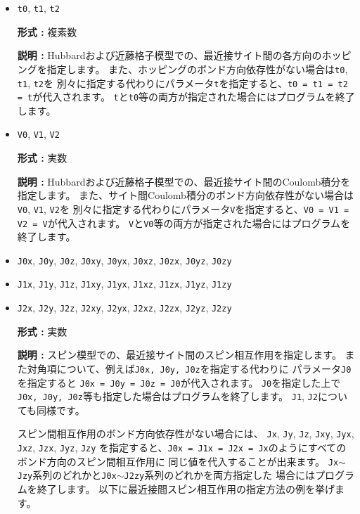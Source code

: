 \begin{itemize}
\item \verb|t0|,  \verb|t1|, \verb|t2|

{\bf 形式 :} 複素数

{\bf 説明 :} Hubbardおよび近藤格子模型での、最近接サイト間の各方向のホッピングを指定します。
また、ホッピングのボンド方向依存性がない場合は\verb|t0|,  \verb|t1|, \verb|t2|を
別々に指定する代わりにパラメータ\verb|t|を指定すると、\verb|t0 = t1 = t2 = t|が代入されます。
\verb|t|と\verb|t0|等の両方が指定された場合にはプログラムを終了します。

\item \verb|V0|,  \verb|V1|, \verb|V2|

{\bf 形式 :} 実数

{\bf 説明 :} Hubbardおよび近藤格子模型での、最近接サイト間のCoulomb積分を指定します。
また、サイト間Coulomb積分のボンド方向依存性がない場合は\verb|V0|,  \verb|V1|, \verb|V2|を
別々に指定する代わりにパラメータ\verb|V|を指定すると、\verb|V0 = V1 = V2 = V|が代入されます。
\verb|V|と\verb|V0|等の両方が指定された場合にはプログラムを終了します。

\item \verb|J0x|, \verb|J0y|, \verb|J0z|, \verb|J0xy|, 
  \verb|J0yx|, \verb|J0xz|, \verb|J0zx|, \verb|J0yz|, \verb|J0zy|
\item \verb|J1x|, \verb|J1y|, \verb|J1z|, \verb|J1xy|, 
  \verb|J1yx|, \verb|J1xz|, \verb|J1zx|, \verb|J1yz|, \verb|J1zy|
\item \verb|J2x|, \verb|J2y|, \verb|J2z|, \verb|J2xy|, 
  \verb|J2yx|, \verb|J2xz|, \verb|J2zx|, \verb|J2yz|, \verb|J2zy|

{\bf 形式 :} 実数

{\bf 説明 :} スピン模型での、最近接サイト間のスピン相互作用を指定します。
また対角項について、例えば\verb|J0x, J0y, J0z|を指定する代わりに
パラメータ\verb|J0|を指定すると
\verb|J0x = J0y = J0z = J0|が代入されます。
\verb|J0|を指定した上で\verb|J0x, J0y, J0z|等も指定した場合はプログラムを終了します。
\verb|J1|, \verb|J2|についても同様です。

スピン間相互作用のボンド方向依存性がない場合には、
\verb|Jx|, \verb|Jy|, \verb|Jz|, \verb|Jxy|, 
\verb|Jyx|, \verb|Jxz|, \verb|Jzx|, \verb|Jyz|, \verb|Jzy|
を指定すると、\verb|J0x = J1x = J2x = Jx|のようにすべてのボンド方向のスピン間相互作用に
同じ値を代入することが出来ます。
\verb|Jx|$\sim$\verb|Jzy|系列のどれかと\verb|J0x|$\sim$\verb|J2zy|系列のどれかを両方指定した
場合にはプログラムを終了します。
以下に最近接間スピン相互作用の指定方法の例を挙げます。


\end{itemize}
